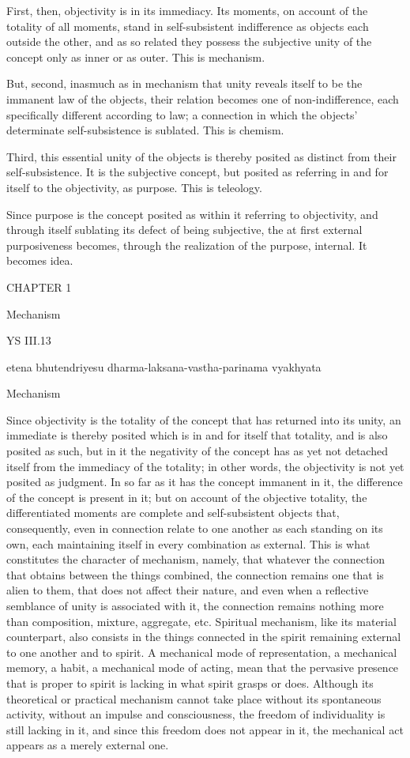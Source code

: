 First, then, objectivity is in its immediacy.
Its moments, on account of the totality of all moments,
stand in self-subsistent indifference
as objects each outside the other,
and as so related they possess
the subjective unity of the concept
only as inner or as outer.
This is mechanism.

But, second, inasmuch as in mechanism that unity
reveals itself to be the immanent law of the objects,
their relation becomes one of non-indifference,
each specifically different according to law;
a connection in which the objects'
determinate self-subsistence is sublated.
This is chemism.

Third, this essential unity of the objects is
thereby posited as distinct from their self-subsistence.
It is the subjective concept,
but posited as referring in and for itself
to the objectivity, as purpose.
This is teleology.

Since purpose is the concept posited
as within it referring to objectivity,
and through itself sublating its defect
of being subjective,
the at first external purposiveness becomes,
through the realization of the purpose, internal.
It becomes idea.

CHAPTER 1

Mechanism

YS III.13

    etena bhutendriyesu dharma-laksana-vastha-parinama vyakhyata

    Mechanism

Since objectivity is the totality of the concept
that has returned into its unity,
an immediate is thereby posited
which is in and for itself that totality,
and is also posited as such,
but in it the negativity of the concept has as yet
not detached itself from the immediacy of the totality;
in other words, the objectivity is not yet posited as judgment.
In so far as it has the concept immanent in it,
the difference of the concept is present in it;
but on account of the objective totality,
the differentiated moments are
complete and self-subsistent objects
that, consequently, even in connection
relate to one another as each standing on its own,
each maintaining itself in every combination as external.
This is what constitutes the character of mechanism,
namely, that whatever the connection that
obtains between the things combined,
the connection remains one that is alien to them,
that does not affect their nature,
and even when a reflective semblance
of unity is associated with it,
the connection remains nothing more than
composition, mixture, aggregate, etc.
Spiritual mechanism, like its material counterpart,
also consists in the things connected in the spirit
remaining external to one another and to spirit.
A mechanical mode of representation,
a mechanical memory, a habit, a mechanical mode of acting,
mean that the pervasive presence that is proper to spirit
is lacking in what spirit grasps or does.
Although its theoretical or practical mechanism
cannot take place without its spontaneous activity,
without an impulse and consciousness,
the freedom of individuality is still lacking in it,
and since this freedom does not appear in it,
the mechanical act appears as a merely external one.

